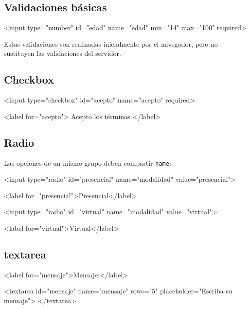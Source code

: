\documentclass[11pt]{article}
\begin{document}
\subsection{Validaciones básicas}

\begin{htmlcodedark}
    <input
    type="number"
    id="edad"
    name="edad"
    min="14"
    max="100"
    required>
\end{htmlcodedark}

Estas validaciones son realizadas inicialmente por el navegador, pero no sustituyen las validaciones del servidor.

\subsection{Checkbox}

\begin{htmlcodedark}
    <input
    type="checkbox"
    id="acepto"
    name="acepto"
    required>

    <label for="acepto">
    Acepto los términos
    </label>
\end{htmlcodedark}

\subsection{Radio}

Las opciones de un mismo grupo deben compartir \texttt{name}:

\begin{htmlcodedark}
    <input
    type="radio"
    id="presencial"
    name="modalidad"
    value="presencial">

    <label for="presencial">Presencial</label>

    <input
    type="radio"
    id="virtual"
    name="modalidad"
    value="virtual">

    <label for="virtual">Virtual</label>
\end{htmlcodedark}

\subsection{textarea}

\begin{htmlcodedark}
    <label for="mensaje">Mensaje:</label>

    <textarea
    id="mensaje"
    name="mensaje"
    rows="5"
    placeholder="Escriba su mensaje">
    </textarea>
\end{htmlcodedark}
\end{document}
